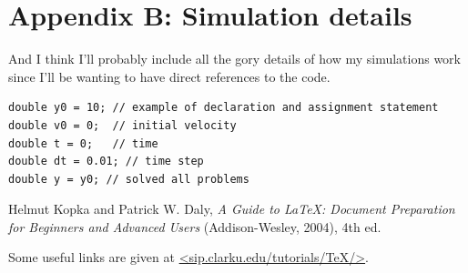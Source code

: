 \documentclass[prb,11pt]{revtex4-1}
\begin{document}
\section{Appendix B: Simulation details}
And I think I'll probably include all the gory details of how my simulations work since I'll be wanting to have direct references to the code. 
\begin{verbatim}
double y0 = 10; // example of declaration and assignment statement
double v0 = 0;  // initial velocity
double t = 0;   // time
double dt = 0.01; // time step
double y = y0; // solved all problems
\end{verbatim}




\begin{thebibliography}{5}

Helmut Kopka and Patrick W. Daly, \textsl{A Guide to
\LaTeX: Document Preparation for Beginners and Advanced Users} (Addison-Wesley, 2004), 4th ed.

Some useful links are
given at \url{<sip.clarku.edu/tutorials/TeX/>}.

\end{thebibliography}
\end{document}
